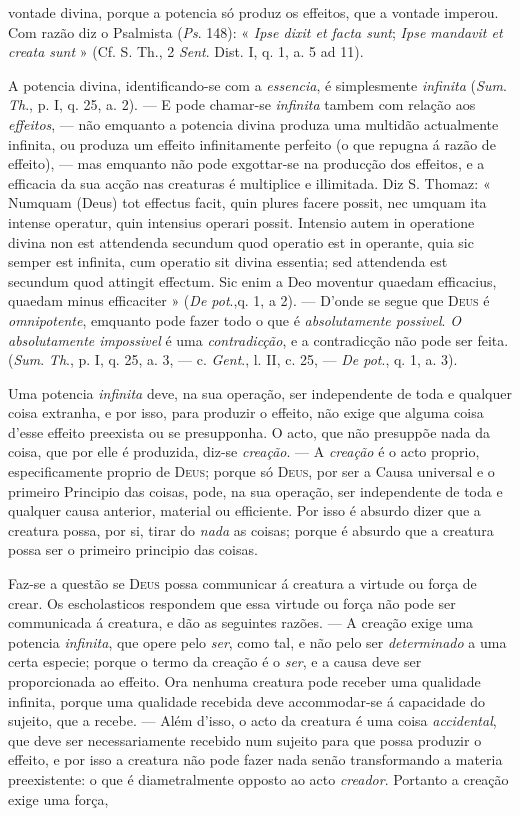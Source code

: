 vontade divina, porque a potencia só produz os effeitos, que a vontade imperou. Com razão diz o Psalmista (\emph{Ps}. 148): « \emph{Ipse dixit et facta sunt}; \emph{Ipse mandavit et creata sunt} » (Cf. S. Th., 2 \emph{Sent}. Dist. I, q. 1, a. 5 ad 11).\par A potencia divina, identificando-se com a \emph{essencia}, é simplesmente \emph{infinita} (\emph{Sum}. \emph{Th}., p. I, q. 25, a. 2). --- E pode chamar-se \emph{infinita} tambem com relação aos \emph{effeitos}, --- não emquanto a potencia divina produza uma multidão actualmente infinita, ou produza um effeito infinitamente perfeito (o que repugna á razão de effeito), --- mas emquanto não pode exgottar-se na producção dos effeitos, e a efficacia da sua acção nas creaturas é multiplice e illimitada. Diz S. Thomaz: « Numquam (Deus) tot effectus facit, quin plures facere possit, nec umquam ita intense operatur, quin intensius operari possit. Intensio autem in operatione divina non est attendenda secundum quod operatio est in operante, quia sic semper est infinita, cum operatio sit divina essentia; sed attendenda est secundum quod attingit effectum. Sic enim a Deo moventur quaedam efficacius, quaedam minus efficaciter » (\emph{De pot}.,q. 1, a 2). --- D'onde se segue que \textsc{Deus} é \emph{omnipotente}, emquanto pode fazer todo o que é \emph{absolutamente possivel}. \emph{O absolutamente impossivel} é uma \emph{contradicção}, e a contradicção não pode ser feita. (\emph{Sum}. \emph{Th}., p. I, q. 25, a. 3, --- c. \emph{Gent}., l. II, c. 25, --- \emph{De pot}., q. 1, a. 3).\par Uma potencia \emph{infinita} deve, na sua operação, ser independente de toda e qualquer coisa extranha, e por isso, para produzir o effeito, não exige que alguma coisa d'esse effeito preexista ou se presupponha. O acto, que não presuppõe nada da coisa, que por elle é produzida, diz-se \emph{creação}. --- A \emph{creação} é o acto proprio, especificamente proprio de \textsc{Deus}; porque só \textsc{Deus}, por ser a Causa universal e o primeiro Principio das coisas, pode, na sua operação, ser independente de toda e qualquer causa anterior, material ou efficiente. Por isso é absurdo dizer que a creatura possa, por si, tirar do \emph{nada} as coisas; porque é absurdo que a creatura possa ser o primeiro principio das coisas.\par Faz-se a questão se \textsc{Deus} possa communicar á creatura a virtude ou força de crear. Os escholasticos respondem que essa virtude ou força não pode ser communicada á creatura, e dão as seguintes razões. --- A creação exige uma potencia \emph{infinita}, que opere pelo \emph{ser}, como tal, e não pelo ser \emph{determinado} a uma certa especie; porque o termo da creação é o \emph{ser}, e a causa deve ser proporcionada ao effeito. Ora nenhuma creatura pode receber uma qualidade infinita, porque uma qualidade recebida deve accommodar-se á capacidade do sujeito, que a recebe. --- Além d'isso, o acto da creatura é uma coisa \emph{accidental}, que deve ser necessariamente recebido num sujeito para que possa produzir o effeito, e por isso a creatura não pode fazer nada senão transformando a materia preexistente: o que é diametralmente opposto ao acto \emph{creador}. Portanto a creação exige uma força, 